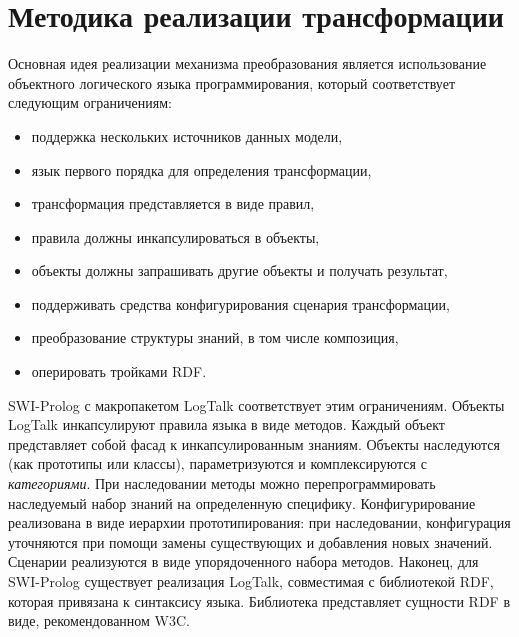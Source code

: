\documentclass[conference]{IEEEtran} \IEEEoverridecommandlockouts
\begin{document}
\section{Методика реализации трансформации } \label{sec:tech-imp}

Основная идея реализации механизма преобразования является использование объектного логического языка программирования, который соответствует следующим ограничениям: \begin{itemize} \item поддержка нескольких источников данных модели, \item язык первого порядка для определения трансформации, \item трансформация представляется в виде правил, \item правила должны инкапсулироваться в объекты, \item объекты должны запрашивать другие объекты и получать результат, \item поддерживать средства конфигурирования сценария трансформации, \item преобразование структуры знаний, в том числе композиция, \item оперировать тройками RDF. \end{itemize}

SWI-Prolog с макропакетом LogTalk соответствует этим ограничениям. Объекты LogTalk инкапсулируют правила языка в виде методов. Каждый объект представляет собой фасад к инкапсулированным знаниям. Объекты наследуются (как прототипы или классы), параметризуются и комплексируются с \emph{категориями}. При наследовании методы можно перепрограммировать наследуемый набор знаний на определенную специфику. Конфигурирование реализована в виде иерархии прототипирования: при наследовании, конфигурация уточняются при помощи замены существующих и добавления новых значений. Сценарии реализуются в виде упорядоченного набора методов. Наконец, для SWI-Prolog существует реализация LogTalk, совместимая с библиотекой RDF, которая привязана к синтаксису языка. Библиотека представляет сущности RDF в виде, рекомендованном W3C.
\end{document}
